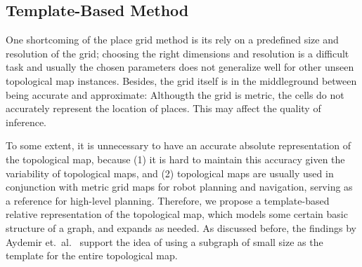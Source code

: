 \documentclass[10pt, titlepage]{article}
\theoremstyle{definition}
\begin{document}


\subsection{Template-Based Method}\label{section:tmpl}

One shortcoming of the place grid method is its rely on a predefined size and resolution of the grid; choosing the right dimensions and resolution is a difficult task and usually the chosen parameters does not generalize well for other unseen topological map instances. Besides, the grid itself is in the middleground between being accurate and approximate: Althougth the grid is metric, the cells do not accurately represent the location of places. This may affect the quality of inference.

To some extent, it is unnecessary to have an accurate absolute representation of the topological map, because (1) it is hard to maintain this accuracy given the variability of topological maps, and (2) topological maps are usually used in conjunction with metric grid maps for robot planning and navigation, serving as a reference for high-level planning. Therefore, we propose a template-based relative representation of the topological map, which models some certain basic structure of a graph, and expands as needed. As discussed before, the findings by  Aydemir et.~al.~\cite{aydemir2012can} support the idea of using a subgraph of small size as the template for the entire topological map.
\end{document}
